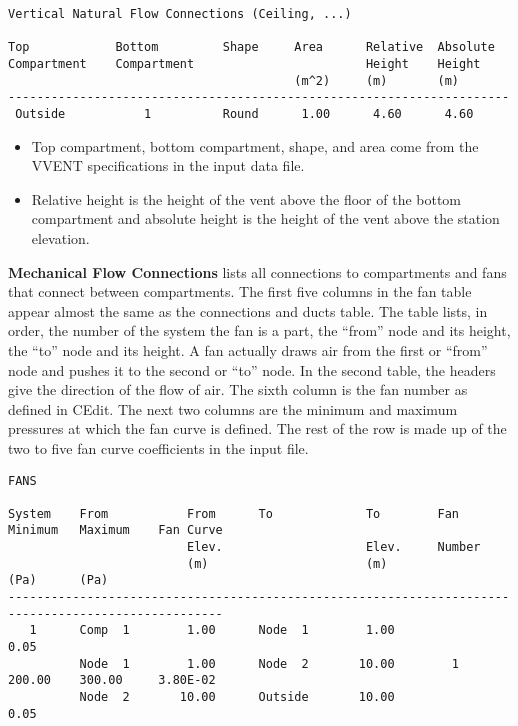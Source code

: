 \begin{lstlisting}[basicstyle=\tiny]
Vertical Natural Flow Connections (Ceiling, ...)

Top            Bottom         Shape     Area      Relative  Absolute
Compartment    Compartment                        Height    Height
                                        (m^2)     (m)       (m)
----------------------------------------------------------------------
 Outside           1          Round      1.00      4.60      4.60
 \end{lstlisting}

\begin{itemize}
\item Top compartment, bottom compartment, shape, and area come from the VVENT specifications in the input data file.
\item Relative height is the height of the vent above the floor of the bottom compartment and absolute height is the height of the vent above the station elevation.
\end{itemize}

\textbf{Mechanical Flow Connections} lists all connections to compartments and fans that connect between compartments. The first five columns in the fan table appear almost the same as the connections and ducts table.  The table lists, in order, the number of the system the fan is a part, the ``from'' node and its height, the ``to'' node and its height.  A fan actually draws air from the first or ``from'' node and pushes it to the second or ``to'' node.  In the second table, the headers give the direction of the flow of air.  The sixth column is the fan number as defined in CEdit.  The next two columns are the minimum and maximum pressures at which the fan curve is defined.  The rest of the row is made up of the two to five fan curve coefficients in the input file.

\begin{lstlisting}[basicstyle=\tiny]
FANS

System    From           From      To             To        Fan       Minimum   Maximum    Fan Curve
                         Elev.                    Elev.     Number
                         (m)                      (m)                 (Pa)      (Pa)
----------------------------------------------------------------------------------------------------
   1      Comp  1        1.00      Node  1        1.00                0.05
          Node  1        1.00      Node  2       10.00        1       200.00    300.00     3.80E-02
          Node  2       10.00      Outside       10.00                0.05
\end{lstlisting}

